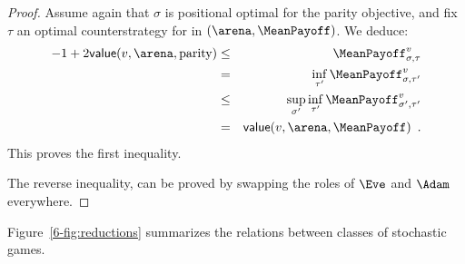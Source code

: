\begin{proof}
    Assume again that $\sigma$ is positional optimal for the parity
    objective, and fix $\tau$ an optimal counterstrategy for \Adam in
    $(\arena,\MeanPayoff)$. We deduce:
    \begin{eqnarray*}
      -1 + 2 \mathsf{value}(v,\arena,\textrm{parity}) & \leq & 
                                                               \MeanPayoff_{\sigma,\tau}^{v}\\
                                                      & = & \inf_{\tau'}
                                                            \MeanPayoff_{\sigma,\tau'}^{v}\\
                                                      & \leq &
                                                                \sup_{\sigma'}\inf_{\tau'}
                                                               \MeanPayoff_{\sigma',\tau'}^{v}\\
                                                      & = & 
                                                            \mathsf{value}(v,\arena,\MeanPayoff) \enspace.
    \end{eqnarray*} 
    This proves the first inequality.

    The reverse inequality, can be proved by swapping the roles of
    $\Eve$ and $\Adam$ everywhere.
\end{proof}

Figure~\ref{6-fig:reductions} summarizes the relations between classes
of stochastic games.
